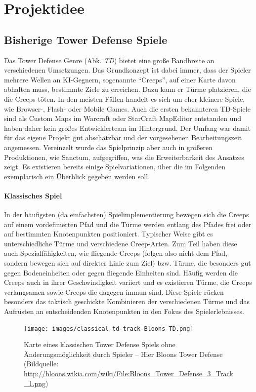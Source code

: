 \section{Projektidee} %
\label{sec:projektidee}

\subsection{Bisherige Tower Defense Spiele} %
\label{sub:bisherige_tower_defense_spiele}
Das Tower Defense Genre (Abk. \emph{TD}) bietet eine große Bandbreite an verschiedenen Umsetzungen. Das Grundkonzept ist dabei immer, dass der Spieler mehrere Wellen an KI-Gegnern, sogenannte \enquote{Creeps}, auf einer Karte davon abhalten muss, bestimmte Ziele zu erreichen. Dazu kann er Türme platzieren, die die Creeps töten. In den meisten Fällen handelt es sich um eher kleinere Spiele, wie Browser-, Flash- oder Mobile Games. Auch die ersten bekannteren TD-Spiele sind als Custom Maps im Warcraft oder StarCraft MapEditor entstanden und haben daher kein großes Entwicklerteam im Hintergrund. Der Umfang war damit für das eigene Projekt gut abschätzbar und der vorgesehenen Bearbeitungszeit angemessen. Vereinzelt wurde das Spielprinzip aber auch in größeren Produktionen, wie Sanctum, aufgegriffen, was die Erweiterbarkeit des Ansatzes zeigt. Es existieren bereits einige Spielvariationen, über die im Folgenden exemplarisch ein Überblick gegeben werden soll.

\paragraph{Klassisches Spiel}
In der häufigsten (da einfachsten) Spielimplementierung bewegen sich die Creeps auf einem vordefinierten Pfad und die Türme werden entlang des Pfades frei oder auf bestimmten Knotenpunkten positioniert. Typischer Weise gibt es unterschiedliche Türme und verschiedene Creep-Arten. Zum Teil haben diese auch Spezialfähigkeiten, wie fliegende Creeps (folgen also nicht dem Pfad, sondern bewegen sich auf direkter Linie zum Ziel) bzw. Türme, die besonders gut gegen Bodeneinheiten oder gegen fliegende Einheiten sind. Häufig werden die Creeps auch in ihrer Geschwindigkeit variiert und es existieren Türme, die Creeps verlangsamen sowie Creeps die dagegen immun sind.  Diese Spiele rücken besonders das taktisch geschickte Kombinieren der verschiedenen Türme und das Aufrüsten an entscheidenden Knotenpunkten in den Fokus des Spielerlebnisses.

\begin{figure}[htb]
	\centering
	\texttt{[image: images/classical-td-track-Bloons-TD.png]}
	\caption{Karte eines klassischen Tower Defense Spiels ohne Änderungsmöglichkeit durch Spieler -- Hier Bloons Tower Defense {\footnotesize (Bildquelle: \url{http://bloons.wikia.com/wiki/File:Bloons_Tower_Defense_3_Track_1.png})}}
\end{figure}

